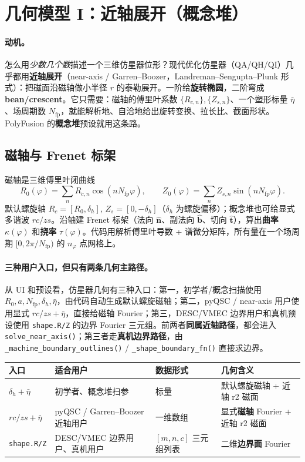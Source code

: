\documentclass[UTF8,11pt]{ctexart}
\newcommand{\nfp}{N_\mathrm{fp}}
\newcommand{\nphi}{n_\varphi}
\newcommand{\etabar}{\bar\eta}
\newcommand{\Nhat}{\hat{\bm n}}
\newcommand{\Bhat}{\hat{\bm b}}
\newcommand{\That}{\hat{\bm t}}
\begin{document}
\section{几何模型 I：近轴展开（概念堆）}\label{sec:nae}

\paragraph{动机。}
怎么用\emph{少数几个数}描述一个三维仿星器位形？现代优化仿星器（QA/QH/QI）几乎都用\textbf{近轴展开}（near-axis / Garren--Boozer，Landreman--Sengupta--Plunk 形式）：把磁面沿磁轴做小半径 $r$ 的泰勒展开。一阶给\textbf{旋转椭圆}，二阶弯成\textbf{bean/crescent}。它只需要：磁轴的傅里叶系数 $\{R_{c,n}\},\{Z_{s,n}\}$、一个塑形标量 $\etabar$、场周期数 $\nfp$，就能解析地、自洽地给出旋转变换、拉长比、截面形状。PolyFusion 的\textbf{概念堆}预设就用这条路。

\subsection{磁轴与 Frenet 标架}
磁轴是三维傅里叶闭曲线
\begin{equation}
R_0(\varphi)=\sum_n R_{c,n}\cos(n\nfp\varphi),\qquad
Z_0(\varphi)=\sum_n Z_{s,n}\sin(n\nfp\varphi).
\end{equation}
默认螺旋轴 $R_{c}=[R_0,\delta_h],\,Z_{s}=[0,-\delta_h]$（$\delta_h$ 为螺旋偏移）；概念堆也可给显式多谐波 $rc/zs$。沿轴建 Frenet 标架（法向 $\Nhat$、副法向 $\Bhat$、切向 $\That$），算出\textbf{曲率} $\kappa(\varphi)$ 和\textbf{挠率} $\tau(\varphi)$。代码用解析傅里叶导数 + 谱微分矩阵，所有量在一个场周期 $[0,2\pi/\nfp)$ 的 $\nphi$ 点网格上。

\paragraph{三种用户入口，但只有两条几何主路径。}
从 UI 和预设看，仿星器几何有三种入口：第一，初学者/概念扫描使用 $R_0,a,\nfp,\delta_h,\etabar$，由代码自动生成默认螺旋磁轴；第二，pyQSC / near-axis 用户使用显式 $rc/zs+\etabar$，直接给磁轴 Fourier；第三，DESC/VMEC 边界用户和真机预设使用 \texttt{shape.R/Z} 的边界 Fourier 三元组。前两者\textbf{同属近轴路径}，都会进入 \texttt{solve\_near\_axis()}；第三者走\textbf{真机边界路径}，由 \texttt{\_machine\_boundary\_outlines()} / \texttt{\_shape\_boundary\_fn()} 直接求边界。

\begin{center}
\renewcommand{\arraystretch}{1.25}
\begin{tabular}{@{}llll@{}}
\toprule
入口 & 适合用户 & 数据形式 & 几何含义 \\
\midrule
$\delta_h+\etabar$ & 初学者、概念堆扫参 & 标量 & 默认螺旋磁轴 + 近轴 r2 磁面 \\
$rc/zs+\etabar$ & pyQSC / Garren--Boozer 近轴用户 & 一维数组 & 显式\textbf{磁轴} Fourier + 近轴 r2 磁面 \\
\texttt{shape.R/Z} & DESC/VMEC 边界用户、真机用户 & $[m,n,c]$ 三元组列表 & 二维\textbf{边界面} Fourier \\
\bottomrule
\end{tabular}
\end{center}
\end{document}
